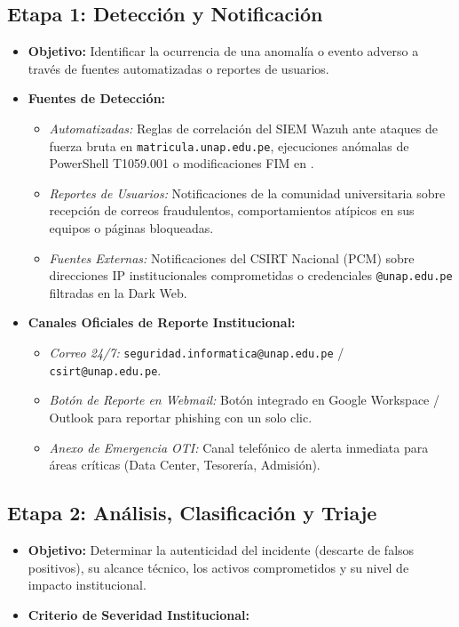 \subsection{Etapa 1: Detección y Notificación}
\begin{itemize}
    \item \textbf{Objetivo:} Identificar la ocurrencia de una anomalía o evento adverso a través de fuentes automatizadas o reportes de usuarios.
    \item \textbf{Fuentes de Detección:}
    \begin{itemize}
        \item \textit{Automatizadas:} Reglas de correlación del SIEM Wazuh ante ataques de fuerza bruta en \texttt{matri\allowbreak cula.\allowbreak unap.\allowbreak edu.pe}, ejecuciones anómalas de PowerShell T1059.001 o modificaciones FIM en .
        \item \textit{Reportes de Usuarios:} Notificaciones de la comunidad universitaria sobre recepción de correos fraudulentos, comportamientos atípicos en sus equipos o páginas bloqueadas.
        \item \textit{Fuentes Externas:} Notificaciones del CSIRT Nacional (PCM) sobre direcciones IP institucionales comprometidas o credenciales \texttt{@unap.edu.pe} filtradas en la Dark Web.
    \end{itemize}
    \item \textbf{Canales Oficiales de Reporte Institucional:}
    \begin{itemize}
        \item \textit{Correo 24/7:} \texttt{seguridad.informatica@unap.edu.pe} / \texttt{csirt@unap.edu.pe}.
        \item \textit{Botón de Reporte en Webmail:} Botón integrado en Google Workspace / Outlook para reportar phishing con un solo clic.
        \item \textit{Anexo de Emergencia OTI:} Canal telefónico de alerta inmediata para áreas críticas (Data Center, Tesorería, Admisión).
    \end{itemize}
\end{itemize}

\subsection{Etapa 2: Análisis, Clasificación y Triaje}

\begin{itemize}
    \item \textbf{Objetivo:} Determinar la autenticidad del incidente (descarte de falsos positivos), su alcance técnico, los activos comprometidos y su nivel de impacto institucional.
    \item \textbf{Criterio de Severidad Institucional:}
\end{itemize}

